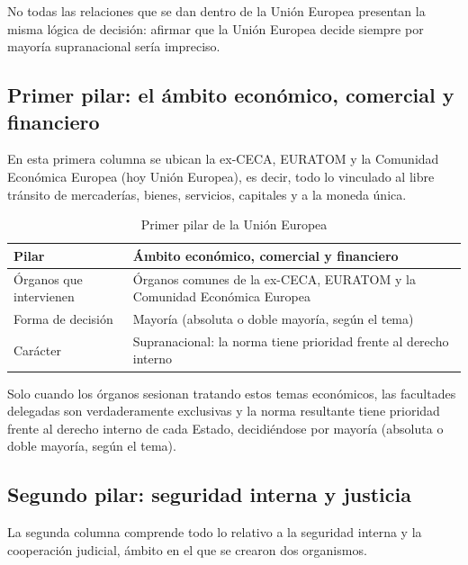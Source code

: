 \documentclass[12pt,oneside]{book}
\begin{document}
\begin{important}
No todas las relaciones que se dan dentro de la Unión Europea presentan la misma lógica de decisión: afirmar que la Unión Europea decide siempre por mayoría supranacional sería impreciso.
\end{important}

\subsection{Primer pilar: el ámbito económico, comercial y financiero}

En esta primera columna se ubican la ex-CECA, EURATOM y la Comunidad Económica Europea (hoy Unión Europea), es decir, todo lo vinculado al libre tránsito de mercaderías, bienes, servicios, capitales y a la moneda única.

\begin{table}[H]
\centering
\begin{tabularx}{\textwidth}{
    >{\raggedright\arraybackslash}p{}
    >{\raggedright\arraybackslash}X
}
\toprule
\textbf{Pilar} & \textbf{Ámbito económico, comercial y financiero} \\
\midrule
Órganos que intervienen & Órganos comunes de la ex-CECA, EURATOM y la Comunidad Económica Europea \\
Forma de decisión & Mayoría (absoluta o doble mayoría, según el tema) \\
Carácter & Supranacional: la norma tiene prioridad frente al derecho interno \\
\bottomrule
\end{tabularx}
\caption{Primer pilar de la Unión Europea}
\end{table}

Solo cuando los órganos sesionan tratando estos temas económicos, las facultades delegadas son verdaderamente exclusivas y la norma resultante tiene prioridad frente al derecho interno de cada Estado, decidiéndose por mayoría (absoluta o doble mayoría, según el tema).

\subsection{Segundo pilar: seguridad interna y justicia}

La segunda columna comprende todo lo relativo a la seguridad interna y la cooperación judicial, ámbito en el que se crearon dos organismos.
\end{document}
